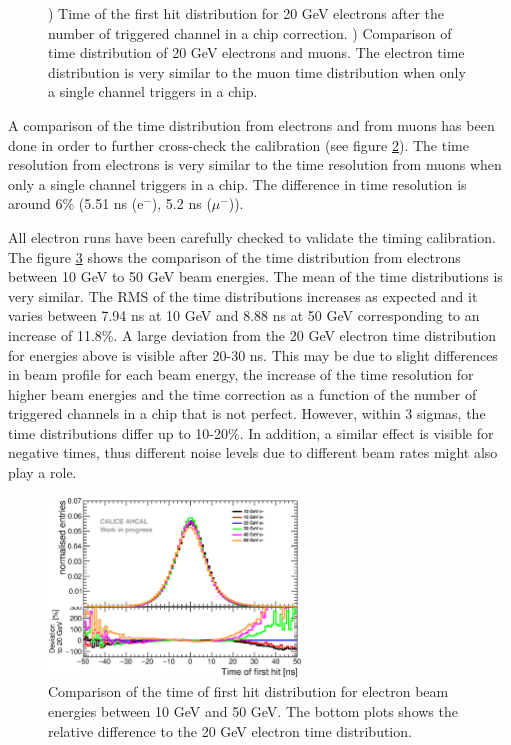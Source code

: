 \begin{figure}[htbp!]
\begin{subfigure}[t]{0.49\textwidth}
		\caption{}\label{fig:timing_electron_muon_comp}
	\end{subfigure}
	\caption{) Time of the first hit distribution for 20 GeV electrons after the number of triggered channel in a chip correction. ) Comparison of time distribution of 20 GeV electrons and muons. The electron time distribution is very similar to the muon time distribution when only a single channel triggers in a chip.}
\end{figure}

A comparison of the time distribution from electrons and from muons has been done in order to further cross-check the calibration (see figure \ref{fig:timing_electron_muon_comp}). The time resolution from electrons is very similar to the time resolution from muons when only a single channel triggers in a chip. The difference in time resolution is around 6\% (5.51 ns (e$^-$), 5.2 ns ($\mu^-$)).

All electron runs have been carefully checked to validate the timing calibration. The figure \ref{fig:all_electron_energies} shows the comparison of the time distribution from electrons between 10 GeV to 50 GeV beam energies. The mean of the time distributions is very similar. The RMS of the time distributions increases as expected and it varies between 7.94 ns at 10 GeV and 8.88 ns at 50 GeV corresponding to an increase of 11.8\%. A large deviation from the 20 GeV electron time distribution for energies above is visible after 20-30 ns. This may be due to slight differences in beam profile for each beam energy, the increase of the time resolution for higher beam energies and the time correction as a function of the number of triggered channels in a chip that is not perfect. However, within 3 sigmas, the time distributions differ up to 10-20\%. In addition, a similar effect is visible for negative times, thus different noise levels due to different beam rates might also play a role.

\begin{figure}[htbp!]
	\centering
	\includegraphics[width=0.6\textwidth]{../Thesis_Plots/Timing/Electrons/Plots/ComparisonDataEnergies.eps}
	\caption{Comparison of the time of first hit distribution for electron beam energies between 10 GeV and 50 GeV. The bottom plots shows the relative difference to the 20 GeV electron time distribution.}
	\label{fig:all_electron_energies}
\end{figure}

